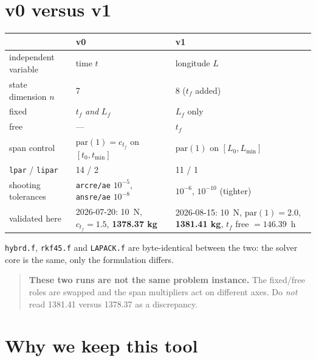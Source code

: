\documentclass[11pt]{article}
\newcommand{\code}[1]{\texttt{\small #1}}
\newcommand{\file}[1]{\texttt{\small #1}}
\newcommand{\Lf}{L_f}
\begin{document}
\section{v0 versus v1}\label{sec:v0v1}

\begin{center}
\footnotesize
\begin{tabular}{@{}l p{5.7cm} p{6.0cm}@{}}
\toprule
 & v0 & v1\\
\midrule
independent variable & time $t$ & longitude $L$\\
state dimension $n$ & 7 & 8 ($t_f$ added)\\
fixed & $t_f$ \emph{and} $\Lf$ & $\Lf$ only\\
free & --- & $t_f$\\
span control & $\mathrm{par}(1) = c_{t_f}$ on $[t_0, t_{\min}]$ &
$\mathrm{par}(1)$ on $[L_0, L_{\min}]$\\
\code{lpar} / \code{lipar} & 14 / 2 & 11 / 1\\
shooting tolerances & \code{arcre/ae} $10^{-5}$, \code{ansre/ae} $10^{-8}$ &
$10^{-6}$, $10^{-10}$ (tighter)\\
validated here & 2026-07-20: 10~N, $c_{t_f} = 1.5$, \textbf{1378.37 kg} &
2026-08-15: 10~N, $\mathrm{par}(1) = 2.0$, \textbf{1381.41 kg}, $t_f$ free
$= 146.39$~h\\
\bottomrule
\end{tabular}
\end{center}

\noindent
\file{hybrd.f}, \file{rkf45.f} and \file{LAPACK.f} are byte-identical between
the two: the solver core is the same, only the formulation differs.

\begin{quote}\small
\textbf{These two runs are not the same problem instance.} The fixed/free
roles are swapped and the span multipliers act on different axes. Do
\emph{not} read 1381.41 versus 1378.37 as a discrepancy.
\end{quote}

\section{Why we keep this tool}\label{sec:why}
\end{document}
